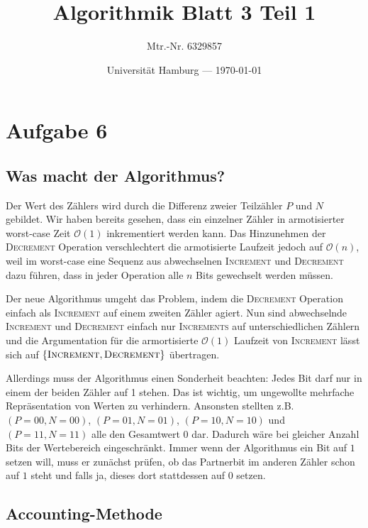 \documentclass[parskip=half,a4paper]{scrartcl}
\title{Algorithmik Blatt 3 Teil 1}
\author{Mtr.-Nr. 6329857}
\date{Universität Hamburg --- \today}
\begin{document}
\maketitle %

\linenumbers


\section*{Aufgabe 6}

\subsection*{Was macht der Algorithmus?}

Der Wert des Zählers wird durch die Differenz zweier Teilzähler $P$ und $N$ gebildet. Wir haben bereits gesehen, dass ein einzelner Zähler in armotisierter worst-case Zeit $\mathcal{O}(1)$ inkrementiert werden kann. Das Hinzunehmen der \textsc{Decrement} Operation verschlechtert die armotisierte Laufzeit jedoch auf $\mathcal{O}(n)$, weil im worst-case eine Sequenz aus abwechselnen \textsc{Increment} und \textsc{Decrement} dazu führen, dass in jeder Operation alle $n$ Bits gewechselt werden müssen.

Der neue Algorithmus umgeht das Problem, indem die \textsc{Decrement} Operation einfach als \textsc{Increment} auf einem zweiten Zähler agiert. Nun sind abwechselnde \textsc{Increment} und \textsc{Decrement} einfach nur \textsc{Increments} auf unterschiedlichen Zählern und die Argumentation für die armortisierte $\mathcal{O}(1)$ Laufzeit von \textsc{Increment} lässt sich auf $\left\{\textsc{Increment}, \textsc{Decrement}\right\}$ übertragen.

Allerdings muss der Algorithmus einen Sonderheit beachten: Jedes Bit darf nur in einem der beiden Zähler auf 1 stehen. Das ist wichtig, um ungewollte mehrfache Repräsentation von Werten zu verhindern. Ansonsten stellten z.B. $(P=00, N=00)$, $(P=01, N=01)$, $(P=10, N=10)$ und $(P=11, N=11)$ alle den Gesamtwert 0 dar. Dadurch wäre bei gleicher Anzahl Bits der Wertebereich eingeschränkt. Immer wenn der Algorithmus ein Bit auf $1$ setzen will, muss er zunächst prüfen, ob das Partnerbit im anderen Zähler schon auf $1$ steht und falls ja, dieses dort stattdessen auf $0$ setzen.

\subsection*{Accounting-Methode}
\end{document}
